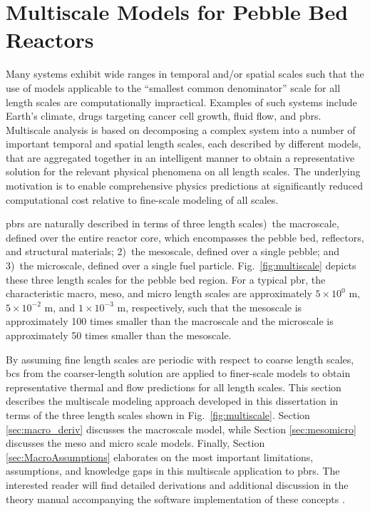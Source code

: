 \chapter{Multiscale Models for Pebble Bed Reactors}
\label{sec:PhysicalModels}

Many systems exhibit wide ranges in temporal and/or spatial scales such that the use of models applicable to the ``smallest common denominator'' scale for all length scales are computationally impractical. Examples of such systems include Earth's climate, drugs targeting cancer cell growth, fluid flow, and \glspl{pbr}. Multiscale analysis is based on decomposing a complex system into a number of important temporal and spatial length scales, each described by different models, that are aggregated together in an intelligent manner to obtain a representative solution for the relevant physical phenomena on all length scales. The underlying motivation is to enable comprehensive physics predictions at significantly reduced computational cost relative to fine-scale modeling of all scales. 

\glspl{pbr} are naturally described in terms of three length scales)~the macroscale, defined over the entire reactor core, which encompasses the pebble bed, reflectors, and structural materials; 2)~the mesoscale, defined over a single pebble; and 3)~the microscale, defined over a single fuel particle. Fig.\ \ref{fig:multiscale} depicts these three length scales for the pebble bed region. For a typical \gls{pbr}, the characteristic macro, meso, and micro length scales are approximately \(5\times10^0\) m, \(5\times10^{-2}\) m, and \(1\times10^{-3}\) m, respectively, such that the mesoscale is approximately 100 times smaller than the macroscale and the microscale is approximately 50 times smaller than the mesoscale. 

By assuming fine length scales are periodic with respect to coarse length scales, \glspl{bc} from the coarser-length solution are applied to finer-scale models to obtain representative thermal and flow predictions for all length scales. This section describes the multiscale modeling approach developed in this dissertation in terms of the three length scales shown in Fig.\ \ref{fig:multiscale}. Section \ref{sec:macro_deriv} discusses the macroscale model, while Section \ref{sec:mesomicro} discusses the meso and micro scale models. Finally, Section \ref{sec:MacroAssumptions} elaborates on the most important limitations, assumptions, and knowledge gaps in this multiscale application to \glspl{pbr}. The interested reader will find detailed derivations and additional discussion in the theory manual accompanying the software implementation of these concepts \cite{novak_manual}. 

